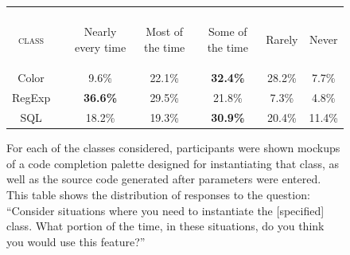 \documentclass[conference]{IEEEtran}
\begin{document}



\begin{figure}
\begin{tabular}{crccccc}\\\\
\textsc{class}
& 
& \begin{rotate}{20}Nearly every time\end{rotate}
& \begin{rotate}{20}Most of the time\end{rotate}
& \begin{rotate}{20}Some of the time\end{rotate}
& \begin{rotate}{20}Rarely\end{rotate}
& \begin{turn}{20}Never\end{turn}\\
\hline
Color &\vline& 9.6\% & 22.1\% & \textbf{32.4\%} & 28.2\% & 7.7\%\\
RegExp &\vline& \textbf{36.6\%} & 29.5\% & 21.8\% & 7.3\% & 4.8\%\\
SQL & \vline &18.2\% & 19.3\% & \textbf{30.9\%} & 20.4\% & 11.4\%\\
\hline
\end{tabular}
\caption{For each of the classes considered, participants were shown mockups of a code completion palette designed for instantiating that class, as well as the source code generated after parameters were entered. This table shows the distribution of responses to the question: ``Consider situations where you need to instantiate the [specified] class. What portion of the time, in these situations, do you think you would use this feature?''}
\end{figure}
%
%
%

%
\end{document}
